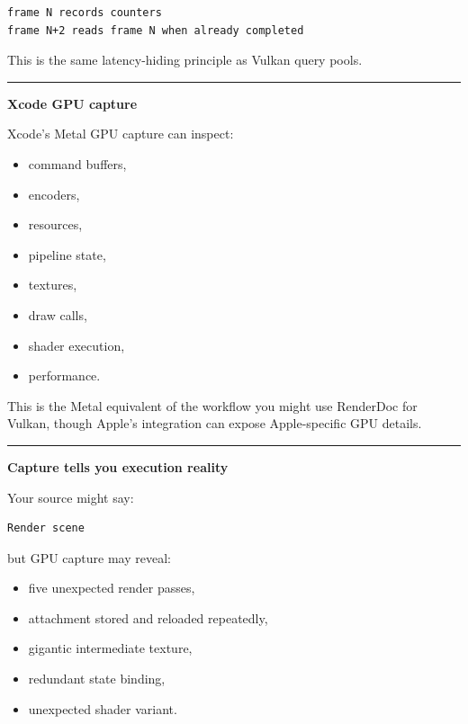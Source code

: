 \begin{verbatim}
frame N records counters
frame N+2 reads frame N when already completed
\end{verbatim}

This is the same latency-hiding principle as Vulkan query pools.

\begin{center}\rule{0.5\linewidth}{0.5pt}\end{center}

\textbf{Xcode GPU capture}

Xcode's Metal GPU capture can inspect:

\begin{itemize}
\tightlist
\item
  command buffers,
\item
  encoders,
\item
  resources,
\item
  pipeline state,
\item
  textures,
\item
  draw calls,
\item
  shader execution,
\item
  performance.
\end{itemize}

This is the Metal equivalent of the workflow you might use RenderDoc for Vulkan, though Apple's integration can expose Apple-specific GPU details.

\begin{center}\rule{0.5\linewidth}{0.5pt}\end{center}

\textbf{Capture tells you execution reality}

Your source might say:

\begin{verbatim}
Render scene
\end{verbatim}

but GPU capture may reveal:

\begin{itemize}
\tightlist
\item
  five unexpected render passes,
\item
  attachment stored and reloaded repeatedly,
\item
  gigantic intermediate texture,
\item
  redundant state binding,
\item
  unexpected shader variant.
\end{itemize}

